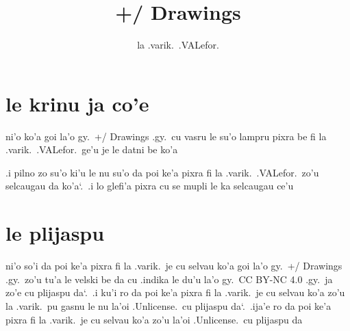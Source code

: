 \documentclass{report}
\title{+/ Drawings}
\author{la .varik.\ .VALefor.}
\newcommand\sds{\spacefactor\sfcode`.\ \space}
\begin{document}
\maketitle{}
\tableofcontents{}
\chapter{le krinu ja co'e}
ni'o ko'a goi la'o gy.\ +/ Drawings .gy.\ cu vasru le su'o lampru pixra be fi la .varik.\ .VALefor.\ ge'u je le datni be ko'a

.i pilno zo su'o ki'u le nu su'o da poi ke'a pixra fi la .varik.\ .VALefor.\ zo'u selcaugau da ko'a\sds  .i lo glefi'a pixra cu se mupli le ka selcaugau ce'u

\chapter{le plijaspu}
ni'o so'i da poi ke'a pixra fi la .varik.\ je cu selvau ko'a goi la'o gy.\ +/ Drawings .gy.\ zo'u tu'a le velski be da cu .indika le du'u la'o gy.\ CC BY-NC 4.0 .gy.\ ja zo'e cu plijaspu da\sds  .i ku'i ro da poi ke'a pixra fi la .varik.\ je cu selvau ko'a zo'u la .varik.\ pu gasnu le nu la'oi .Unlicense.\ cu plijaspu da\sds  .ija'e ro da poi ke'a pixra fi la .varik.\ je cu selvau ko'a zo'u la'oi .Unlicense.\ cu plijaspu da
\end{document}
